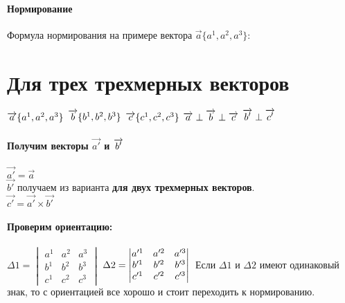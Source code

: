 \documentclass{book}
\begin{document}
\paragraph*{Нормирование}
Формула нормирования на примере вектора $\overrightarrow{a}\{a^1,a^2,a^3\}$:\\
\section{Для трех трехмерных векторов}
$\overrightarrow{a}\{a^1,a^2,a^3\}\\$
$\overrightarrow{b}\{b^1,b^2,b^3\}\\$
$\overrightarrow{c}\{c^1,c^2,c^3\}\\$
$\overrightarrow{a}\perp\overrightarrow{b}\perp\overrightarrow{c}\\$
$\overrightarrow{b'}\perp\overrightarrow{c'}\\$\\
\paragraph*{Получим векторы $\overrightarrow{a'}$ и $\overrightarrow{b'}\\$}
$\overrightarrow{a'}=\overrightarrow{a}$\\
$\overrightarrow{b'}$ получаем из варианта \textbf{для двух трехмерных векторов}.\\
$\overrightarrow{c'}=\overrightarrow{a'}\times\overrightarrow{b'}$
\paragraph*{Проверим ориентацию:\\}
$\Delta1=\begin{vmatrix}
    a^1 & a^2 & a^3\\
    b^1 & b^2 & b^3\\
    c^1 & c^2 & c^3
\end{vmatrix}
$
$\Delta2=\begin{vmatrix}
    a'^1 & a'^2 & a'^3\\
    b'^1 & b'^2 & b'^3\\
    c'^1 & c'^2 & c'^3
\end{vmatrix}
\\$
Если $\Delta1$ и $\Delta2$ имеют одинаковый знак, то с ориентацией все хорошо и стоит переходить к нормированию.
\newpage
\end{document}
